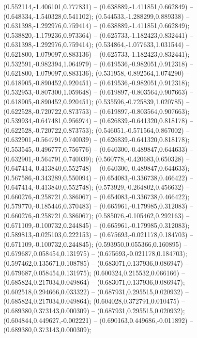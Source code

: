  (0.552114,-1.406101,0.777831) -- (0.638889,-1.411851,0.662849) -- (0.648334,-1.540328,0.541102);
 (0.544533,-1.288299,0.889338) -- (0.631398,-1.292976,0.759414) -- (0.638889,-1.411851,0.662849);
 (0.538820,-1.179236,0.973364) -- (0.625733,-1.182423,0.832441) -- (0.631398,-1.292976,0.759414);
 (0.534864,-1.077633,1.031544) -- (0.621800,-1.079097,0.883136) -- (0.625733,-1.182423,0.832441);
 (0.532591,-0.982394,1.064979) -- (0.619536,-0.982051,0.912318) -- (0.621800,-1.079097,0.883136);
 (0.531958,-0.892564,1.074290) -- (0.618905,-0.890452,0.920451) -- (0.619536,-0.982051,0.912318);
 (0.532953,-0.807300,1.059648) -- (0.619897,-0.803564,0.907663) -- (0.618905,-0.890452,0.920451);
 (0.535596,-0.725839,1.020785) -- (0.622528,-0.720722,0.873753) -- (0.619897,-0.803564,0.907663);
 (0.539934,-0.647481,0.956974) -- (0.626839,-0.641320,0.818178) -- (0.622528,-0.720722,0.873753);
 (0.546051,-0.571564,0.867002) -- (0.632901,-0.564791,0.740039) -- (0.626839,-0.641320,0.818178);
 (0.553545,-0.496777,0.756776) -- (0.640300,-0.489847,0.644633) -- (0.632901,-0.564791,0.740039);
 (0.560778,-0.420683,0.650328) -- (0.647414,-0.413840,0.552748) -- (0.640300,-0.489847,0.644633);
 (0.567586,-0.343289,0.550094) -- (0.654083,-0.336738,0.466422) -- (0.647414,-0.413840,0.552748);
 (0.573929,-0.264802,0.456632) -- (0.660276,-0.258721,0.386067) -- (0.654083,-0.336738,0.466422);
 (0.579770,-0.185446,0.370483) -- (0.665961,-0.179985,0.312083) -- (0.660276,-0.258721,0.386067);
 (0.585076,-0.105462,0.292163) -- (0.671109,-0.100732,0.244845) -- (0.665961,-0.179985,0.312083);
 (0.589813,-0.025103,0.222153) -- (0.675693,-0.021178,0.184703) -- (0.671109,-0.100732,0.244845);
 (0.593950,0.055366,0.160895) -- (0.679687,0.058454,0.131975) -- (0.675693,-0.021178,0.184703);
 (0.597462,0.135671,0.108785) -- (0.683071,0.137936,0.086947) -- (0.679687,0.058454,0.131975);
 (0.600324,0.215532,0.066166) -- (0.685824,0.217034,0.049864) -- (0.683071,0.137936,0.086947);
 (0.602518,0.294666,0.033322) -- (0.687931,0.295515,0.020932) -- (0.685824,0.217034,0.049864);
 (0.604028,0.372791,0.010475) -- (0.689380,0.373143,0.000309) -- (0.687931,0.295515,0.020932);
 (0.604844,0.449627,-0.002221) -- (0.690163,0.449686,-0.011892) -- (0.689380,0.373143,0.000309);
